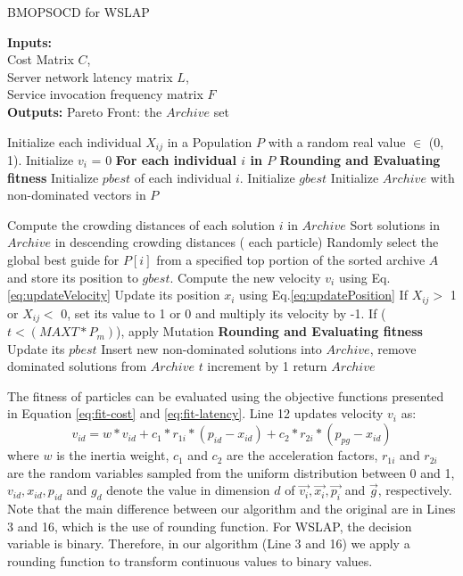 \documentclass[10pt,journal,compsoc]{IEEEtran}
\begin{document}
\begin{algorithm}[!htb]
 \caption{BMOPSOCD for WSLAP}
 \footnotesize
 \textbf{Inputs:} \\
  Cost Matrix $C$, \\
  Server network latency matrix $L$, \\
  Service invocation frequency matrix $F$ \\
 \textbf{Outputs:}
  Pareto Front: the $Archive$ set

 \begin{algorithmic}[1]
  \State Initialize each individual $X_{ij}$ in a Population $P$ with a random real value $\in$ (0, 1).
  \State Initialize $v_i$ = 0
  \State \textbf{For each individual $i$ in $P$ Rounding and Evaluating fitness}
  \State Initialize $pbest$ of each individual $i$.
  \State Initialize $gbest$
  \State Initialize $Archive$ with non-dominated vectors in $P$

  \Repeat
   \State Compute the crowding distances of each solution $i$ in $Archive$
   \State Sort solutions in $Archive$ in descending crowding distances
   \For ( each particle)
    \State Randomly select the global best guide for $P[i]$ from a specified top portion of the sorted archive $A$ and store its position to $gbest$.
    \State Compute the new velocity $v_i$ using Eq.\ref{eq:updateVelocity}
    \State Update its position $x_i$ using Eq.\ref{eq:updatePosition}
    \State If $X_{ij} >$ 1 or $X_{ij} <$ 0, set its value to 1 or 0 and multiply its velocity by -1.
    \State If ($t < (MAXT * P_m)$), apply Mutation
    \State \textbf{Rounding and Evaluating fitness}
    \State Update its $pbest$
    \EndFor
  \State Insert new non-dominated solutions into $Archive$, remove dominated solutions from $Archive$
  \State $t$ increment by 1
  \State return $Archive$
 \end{algorithmic}
 \label{alg:BMOPSOCD}
\end{algorithm}

The fitness of particles can be evaluated using the objective functions presented in Equation  \ref{eq:fit-cost} and \ref{eq:fit-latency}. Line 12 updates velocity $v_i$ as:
\begin{equation}
 v_{id} = w * v_{id} + c_1 * r_{1i} * (p_{id} - x_{id}) + c_2 * r_{2i} * (p_{pg} - x_{id})
\end{equation}
\noindent where $w$ is the inertia weight, $c_1$ and $c_2$ are the acceleration factors, $r_{1i}$ and $r_{2i}$ are the random variables sampled from the uniform distribution between 0 and 1, $v_{id}, x_{id}, p_{id}$ and $g_{d}$ denote the value in dimension $d$ of $\vec{v_i}, \vec{x_i},\vec{p_i}$ and $\vec{g}$, respectively.  Note that the main difference between our algorithm and the original \cite{Raquel} are in Lines 3 and 16, which is the use of rounding function. For WSLAP, the decision variable is binary. Therefore, in our algorithm (Line 3 and 16) we apply a rounding function to transform continuous values to binary values.
\end{document}
